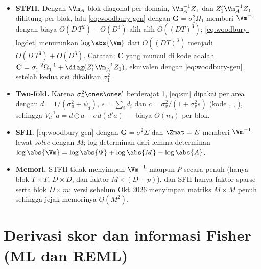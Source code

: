 \begin{itemize}
  \item \textbf{STFH.} Dengan $\Vm_A$ blok diagonal per domain,
        $\Vm_A^{-1}Z_1$ dan $Z_1'\Vm_A^{-1}Z_1$ dihitung per blok, lalu
        \eqref{eq:woodbury-gen} dengan $\mathbf G=\sigma_1^2\Omega_1$ memberi
        $\Vm^{-1}$ dengan biaya $O(D\,T^2)+O(D^3)$ alih-alih $O((DT)^3)$;
        \eqref{eq:woodbury-logdet} menurunkan $\log\abs{\Vm}$ dari
        $O((DT)^3)$ menjadi $O(D\,T^3)+O(D^3)$. Catatan: $\mathbf C$ yang
        muncul di kode adalah
        $\mathbf C=\sigma_1^{-2}\Omega_1^{-1}+\diag(Z_1'\Vm_A^{-1}Z_1)$,
        ekuivalen dengan \eqref{eq:woodbury-gen} setelah kedua sisi
        dikalikan $\sigma_1^2$.
  \item \textbf{Two-fold.} Karena $\sigma_v^2\ones\ones'$ berderajat 1,
        \eqref{eq:sm} dipakai per area dengan
        $d=1/(\sigma_u^2+\psi_d)$, $s=\sum_i d_i$ dan
        $c=\sigma_v^2/(1+\sigma_v^2 s)$ (kode , ,
        ), sehingga $V_d^{-1}a=d\odot a-c\,d(d'a)$ --- biaya
        $O(n_d)$ per blok.
  \item \textbf{SFH.} \eqref{eq:woodbury-gen} dengan $\mathbf G=\sigma^2
        \Sigma$ dan $\Zmat=E$ memberi $\Vm^{-1}$ lewat \emph{solve} dengan
        $M$; log-determinan dari lemma determinan
        $\log\abs{\Vm}=\log\abs{\Psi}+\log\abs{M}-\log\abs{A}$.
  \item \textbf{Memori.} STFH tidak menyimpan $\Vm^{-1}$ maupun $P$ secara
        penuh (hanya blok $T\times T$, $D\times D$, dan faktor
        $M\times(D+p)$), dan SFH hanya faktor sparse serta blok
        $D\times m$; versi sebelum Okt 2026 menyimpan matriks $M\times M$
        penuh sehingga jejak memorinya $O(M^2)$.
\end{itemize}

\section{Derivasi skor dan informasi Fisher (ML dan REML)}\label{app:score}\label{sec:derivasi}

